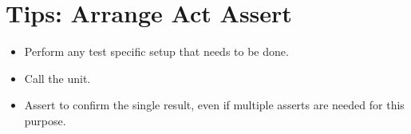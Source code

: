\documentclass{article}
\begin{document}
\sloppy
\section{Tips: Arrange Act Assert}
\begin{itemize}
    \item Perform any test specific setup that needs to be done.
    \item Call the unit.
    \item Assert to confirm the single result, even if multiple asserts are
        needed for this purpose.
\end{itemize}
\end{document}

